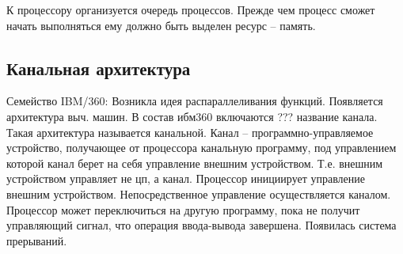 К процессору организуется очередь процессов. Прежде чем процесс сможет начать выполняться ему должно быть выделен ресурс – память. 

\subsection{Канальная архитектура}

Семейство  IBM/360:
Возникла идея распараллеливания функций. Появляется архитектура выч. машин. В состав ибм360 включаются ??? название канала. Такая архитектура называется канальной. Канал – программно-управляемое устройство, получающее от процессора канальную программу, под управлением которой канал берет на себя управление внешним устройством. Т.е. внешним устройством управляет не цп, а канал. Процессор инициирует управление внешним устройством. Непосредственное управление осуществляется каналом. Процессор может переключиться на другую программу, пока не получит управляющий сигнал, что операция ввода-вывода завершена. Появилась система прерываний.


